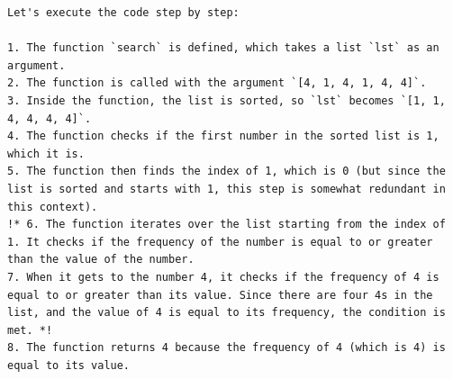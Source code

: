 \begin{lstlisting}[frame=single]
Let's execute the code step by step:

1. The function `search` is defined, which takes a list `lst` as an argument.
2. The function is called with the argument `[4, 1, 4, 1, 4, 4]`.
3. Inside the function, the list is sorted, so `lst` becomes `[1, 1, 4, 4, 4, 4]`.
4. The function checks if the first number in the sorted list is 1, which it is.
5. The function then finds the index of 1, which is 0 (but since the list is sorted and starts with 1, this step is somewhat redundant in this context).
!* 6. The function iterates over the list starting from the index of 1. It checks if the frequency of the number is equal to or greater than the value of the number.
7. When it gets to the number 4, it checks if the frequency of 4 is equal to or greater than its value. Since there are four 4s in the list, and the value of 4 is equal to its frequency, the condition is met. *!
8. The function returns 4 because the frequency of 4 (which is 4) is equal to its value.
\end{lstlisting}